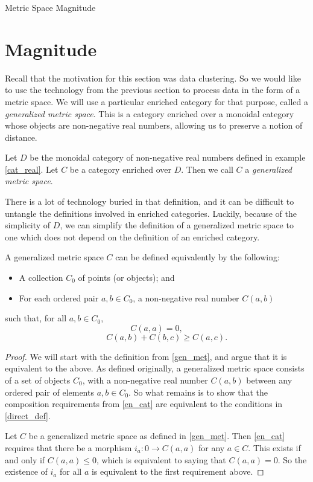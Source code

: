 \documentclass[12pt]{pom_thesis}
\begin{document}
\begin{chapter}{Metric Space Magnitude}
\section{Magnitude}
Recall that the motivation for this section was data clustering. So we would like to use the technology from the previous section to process data in the form of a metric space. We will use a particular enriched category for that purpose, called a \emph{generalized metric space}. This is a category enriched over a monoidal category whose objects are non-negative real numbers, allowing us to preserve a notion of distance. 
\begin{defn}\label{gen_met}
Let $D$ be the monoidal category of non-negative real numbers defined in example \ref{cat_real}. Let $C$ be a category enriched over $D$. Then we call $C$ a \emph{generalized metric space}.
\end{defn}
There is a lot of technology buried in that definition, and it can be difficult to untangle the definitions involved in enriched categories. Luckily, because of the simplicity of $D$, we can simplify the definition of a generalized metric space to one which does not depend on the definition of an enriched category.
\begin{thm}\label{direct_def}
A generalized metric space $C$ can be defined equivalently by the following:
\begin{itemize}
\item A collection $C_0$ of points (or objects); and
\item For each ordered pair $a,b \in C_0$, a non-negative real number $C(a,b)$
\end{itemize}
such that, for all $a,b \in C_0$,
\[C(a,a) = 0,
\]
\[\hspace{1cm} C(a,b) + C(b,c) \geq C(a,c).
\]
\end{thm}
\begin{proof}
We will start with the definition from \ref{gen_met}, and argue that it is equivalent to the above. As defined originally, a generalized metric space consists of a set of objects $C_0$, with a non-negative real number $C(a,b)$ between any ordered pair of elements $a,b \in C_0$. So what remains is to show that the composition requirements from \ref{en_cat} are equivalent to the conditions in \ref{direct_def}. 

Let $C$ be a generalized metric space as defined in \ref{gen_met}. Then \ref{en_cat} requires that there be a morphism $i_a:0 \rightarrow C(a,a)$ for any $a \in C$. This exists if and only if $C(a,a) \leq 0$, which is equivalent to saying that $C(a,a)=0$. So the existence of $i_a$ for all $a$ is equivalent to the first requirement above.


\end{proof}
\end{chapter}
\end{document}
